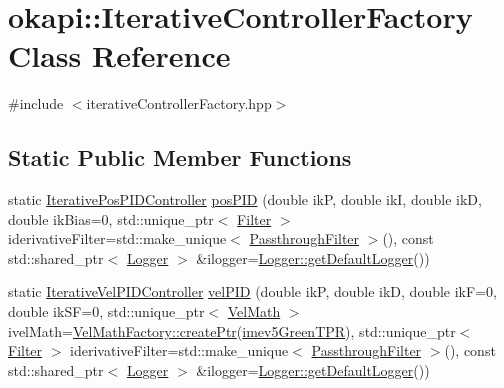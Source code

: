 \hypertarget{classokapi_1_1IterativeControllerFactory}{}\section{okapi\+::Iterative\+Controller\+Factory Class Reference}
\label{classokapi_1_1IterativeControllerFactory}


{\ttfamily \#include $<$iterative\+Controller\+Factory.\+hpp$>$}

\subsection*{Static Public Member Functions}
\begin{DoxyCompactItemize}
\item 
static \mbox{\hyperlink{classokapi_1_1IterativePosPIDController}{Iterative\+Pos\+P\+I\+D\+Controller}} \mbox{\hyperlink{classokapi_1_1IterativeControllerFactory_a2ff979d01d67cee2c0d86b07690a8081}{pos\+P\+ID}} (double ikP, double ikI, double ikD, double ik\+Bias=0, std\+::unique\+\_\+ptr$<$ \mbox{\hyperlink{classokapi_1_1Filter}{Filter}} $>$ iderivative\+Filter=std\+::make\+\_\+unique$<$ \mbox{\hyperlink{classokapi_1_1PassthroughFilter}{Passthrough\+Filter}} $>$(), const std\+::shared\+\_\+ptr$<$ \mbox{\hyperlink{classokapi_1_1Logger}{Logger}} $>$ \&ilogger=\mbox{\hyperlink{classokapi_1_1Logger_a5053cf778b4b55acba788a3797dc96d2}{Logger\+::get\+Default\+Logger}}())
\item 
static \mbox{\hyperlink{classokapi_1_1IterativeVelPIDController}{Iterative\+Vel\+P\+I\+D\+Controller}} \mbox{\hyperlink{classokapi_1_1IterativeControllerFactory_a7b9d88febe596e3fd11eca8a91f2c05c}{vel\+P\+ID}} (double ikP, double ikD, double ikF=0, double ik\+SF=0, std\+::unique\+\_\+ptr$<$ \mbox{\hyperlink{classokapi_1_1VelMath}{Vel\+Math}} $>$ ivel\+Math=\mbox{\hyperlink{classokapi_1_1VelMathFactory_a26b75e227e114812131c64d17015948f}{Vel\+Math\+Factory\+::create\+Ptr}}(\mbox{\hyperlink{namespaceokapi_a5263bab3bfecd482a573b6d04fb584ac}{imev5\+Green\+T\+PR}}), std\+::unique\+\_\+ptr$<$ \mbox{\hyperlink{classokapi_1_1Filter}{Filter}} $>$ iderivative\+Filter=std\+::make\+\_\+unique$<$ \mbox{\hyperlink{classokapi_1_1PassthroughFilter}{Passthrough\+Filter}} $>$(), const std\+::shared\+\_\+ptr$<$ \mbox{\hyperlink{classokapi_1_1Logger}{Logger}} $>$ \&ilogger=\mbox{\hyperlink{classokapi_1_1Logger_a5053cf778b4b55acba788a3797dc96d2}{Logger\+::get\+Default\+Logger}}())
\item 

\end{DoxyCompactItemize}
